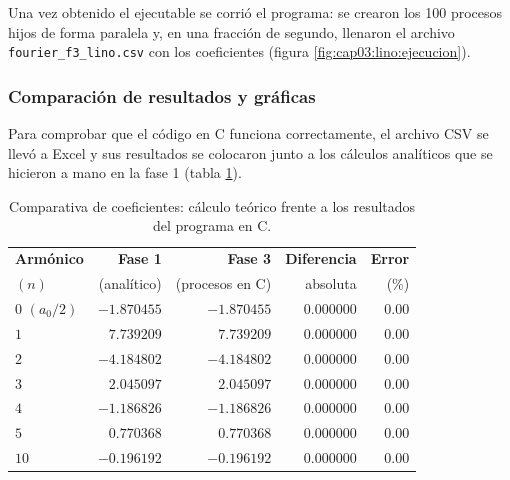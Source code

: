 
Una vez obtenido el ejecutable se corrió el programa: se crearon los 100 procesos hijos de forma paralela y, en una fracción de segundo, llenaron el archivo \texttt{fourier\_f3\_lino.csv} con los coeficientes (figura \ref{fig:cap03:lino:ejecucion}).


\subsubsection{Comparación de resultados y gráficas}
\label{sec:cap03:lino:resultados}

Para comprobar que el código en C funciona correctamente, el archivo CSV se llevó a Excel y sus resultados se colocaron junto a los cálculos analíticos que se hicieron a mano en la fase 1 (tabla \ref{tab:cap03:lino:comparacion}).

\begin{table}[H]
    \centering
    \caption{Comparativa de coeficientes: cálculo teórico frente a los resultados del programa en C.}
    \label{tab:cap03:lino:comparacion}
    \begin{tabular}{lrrrr}
        \toprule
        \textbf{Armónico} & \textbf{Fase 1} & \textbf{Fase 3} & \textbf{Diferencia} & \textbf{Error} \\
        $(n)$ & (analítico) & (procesos en C) & absoluta & (\%) \\
        \midrule
        $0$ $(a_0/2)$ & $-1.870455$ & $-1.870455$ & $0.000000$ & $0.00$ \\
        $1$ & $7.739209$ & $7.739209$ & $0.000000$ & $0.00$ \\
        $2$ & $-4.184802$ & $-4.184802$ & $0.000000$ & $0.00$ \\
        $3$ & $2.045097$ & $2.045097$ & $0.000000$ & $0.00$ \\
        $4$ & $-1.186826$ & $-1.186826$ & $0.000000$ & $0.00$ \\
        $5$ & $0.770368$ & $0.770368$ & $0.000000$ & $0.00$ \\
        $10$ & $-0.196192$ & $-0.196192$ & $0.000000$ & $0.00$ \\
        \bottomrule
    \end{tabular}
\end{table}

